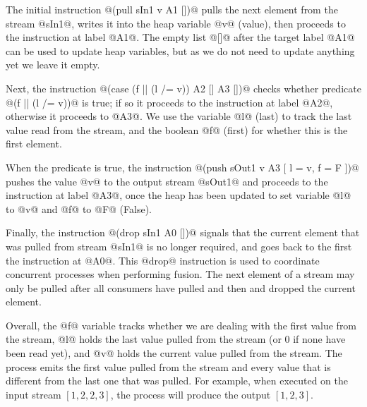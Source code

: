 The initial instruction @(pull sIn1 v A1 [])@ pulls the next element from the stream @sIn1@, writes it into the heap variable @v@ (value), then proceeds to the instruction at label @A1@. The empty list @[]@ after the target label @A1@ can be used to update heap variables, but as we do not need to update anything yet we leave it empty. 

Next, the instruction @(case (f || (l /= v)) A2 [] A3 [])@ checks whether predicate @(f || (l /= v))@ is true; if so it proceeds to the instruction at label @A2@, otherwise it proceeds to @A3@. We use the variable @l@ (last) to track the last value read from the stream, and the boolean @f@ (first) for whether this is the first element.

When the predicate is true, the instruction @(push sOut1 v A3 [ l = v, f = F ])@ pushes the value @v@ to the output stream @sOut1@ and proceeds to the instruction at label @A3@, once the heap has been updated to set variable @l@ to @v@ and @f@ to @F@ (False). 

Finally, the instruction @(drop sIn1 A0 [])@ signals that the current element that was pulled from stream @sIn1@ is no longer required, and goes back to the first the instruction at @A0@. This @drop@ instruction is used to coordinate concurrent processes when performing fusion. The next element of a stream may only be pulled after all consumers have pulled and then and dropped the current element.

Overall, the @f@ variable tracks whether we are dealing with the first value from the stream, @l@ holds the last value pulled from the stream (or 0 if none have been read yet), and @v@ holds the current value pulled from the stream. The process emits the first value pulled from the stream and every value that is different from the last one that was pulled. For example, when executed on the input stream $[1, 2, 2, 3]$, the process will produce the output $[1, 2, 3]$.

